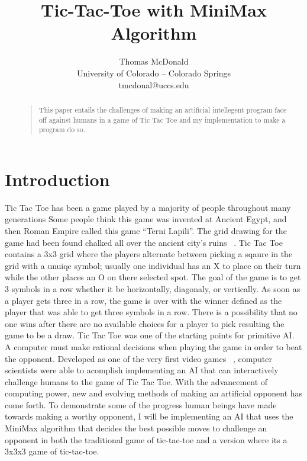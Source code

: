 \documentclass[letterpaper]{article}
\begin{document}
%
\title{Tic-Tac-Toe with MiniMax Algorithm}
\author{ Thomas McDonald\\
University of Colorado – Colorado Springs\\
tmcdonal@uccs.edu\\
}
\maketitle
\begin{abstract}
\begin{quote}
This paper entails the challenges of making an artificial intellegent program face off against humans in a game of Tic Tac Toe and my implementation to make a program do so.  
\end{quote}
\end{abstract}

\section{Introduction}
Tic Tac Toe has been a game played by a majority of people throughout many generations Some people think this game was  invented at Ancient Egypt, and then Roman Empire called this game “Terni Lapili”. The grid drawing for the game had been found chalked all over the ancient city’s ruins ~\cite{unknown}. Tic Tac Toe contains a 3x3 grid where the players alternate between picking a sqaure in the grid with a unuiqe symbol; usually one individual has an X to place on their turn while the other places an O on there selected spot. The goal of the game is to get 3 symbols in a row whether it be horizontally, diagonaly, or vertically. As soon as a player gets three in a row, the game is over with the winner defined as the player that was able to get three symbols in a row. There is a possibility that no one wins after there are no available choices for a player to pick resulting the game to be a draw. Tic Tac Toe was one of the starting points for primitive AI. A computer must make rational decisions when playing the game in order to beat the opponent. Developed as one of the very first video games ~\cite {wikes}, computer scientists were able to acomplish implementing an AI that can interactively challenge humans to the game of Tic Tac Toe. With the advancement of computing power, new and evolving methods of making an artificial opponent has come forth. To demonstrate some of the progress human beings have made towards making a worthy opponent, I will be implementing an AI that uses the MiniMax algorithm that decides the best possible moves to challenge an opponent in both the traditional game of tic-tac-toe and a version where its a 3x3x3 game of tic-tac-toe.
\end{document}
